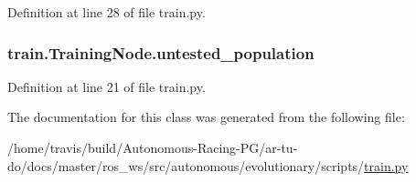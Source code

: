 Definition at line 28 of file train.\+py.

\subsubsection[{\texorpdfstring{untested\+\_\+population}{untested_population}}]{\setlength{\rightskip}{0pt plus 5cm}train.\+Training\+Node.\+untested\+\_\+population}\hypertarget{classtrain_1_1_training_node_a6724c3a14d24c6d8d6a4d7e29126627f}{}\label{classtrain_1_1_training_node_a6724c3a14d24c6d8d6a4d7e29126627f}


Definition at line 21 of file train.\+py.



The documentation for this class was generated from the following file\+:\begin{DoxyCompactItemize}
\item 
/home/travis/build/\+Autonomous-\/\+Racing-\/\+P\+G/ar-\/tu-\/do/docs/master/ros\+\_\+ws/src/autonomous/evolutionary/scripts/\hyperlink{evolutionary_2scripts_2train_8py}{train.\+py}\end{DoxyCompactItemize}
